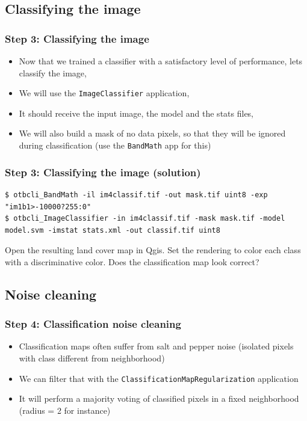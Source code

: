 \documentclass[8pt]{beamer}
\begin{document}
\subsection{Classifying the image}

\begin{frame}
\frametitle{Step 3: Classifying the image}

\begin{itemize}
\item Now that we trained a classifier with a satisfactory level of performance, lets classify the image,
\item We will use the \texttt{ImageClassifier} application,
\item It should receive the input image, the model and the stats files,
\item We will also build a mask of no data pixels, so that they will be ignored during classification (use the \texttt{BandMath} app for this)
\end{itemize}

\end{frame}


\begin{frame}[fragile]
\frametitle{Step 3: Classifying the image (solution)}

\begin{scriptsize}
\begin{verbatim}
$ otbcli_BandMath -il im4classif.tif -out mask.tif uint8 -exp "im1b1>-10000?255:0"
$ otbcli_ImageClassifier -in im4classif.tif -mask mask.tif -model model.svm -imstat stats.xml -out classif.tif uint8
\end{verbatim}
\end{scriptsize}
Open the resulting land cover map in Qgis. Set the rendering to color each class with a discriminative color. Does the classification map look correct?
\end{frame}


\subsection{Noise cleaning}

\begin{frame}
\frametitle{Step 4: Classification noise cleaning}

\begin{itemize}
\item Classification maps often suffer from salt and pepper noise (isolated pixels with class different from neighborhood)
\item We can filter that with the \texttt{ClassificationMapRegularization} application
\item It will perform a majority voting of classified pixels in a fixed neighborhood (radius = 2 for instance)
\end{itemize}

\end{frame}
\end{document}
